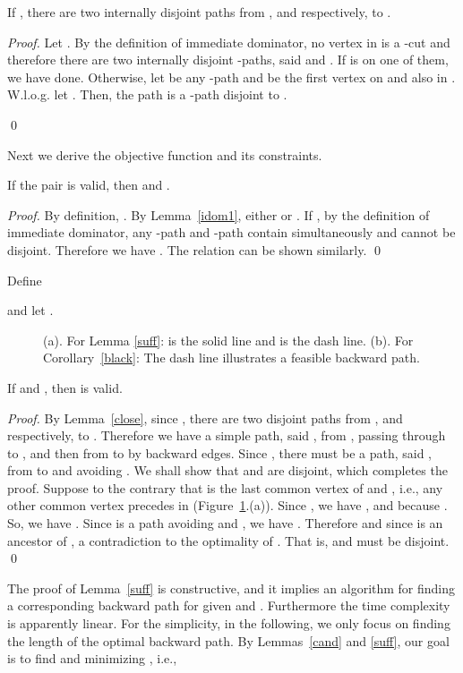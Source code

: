 \begin{lemma}\label{close}
If , there are two internally disjoint paths from , and  respectively, to . 
\end{lemma}
\begin{proof}
Let .
By the definition of immediate dominator, no vertex in  is a -cut and therefore there are two internally disjoint -paths, said  and .
If  is on one of them, we have done.
Otherwise, let  be any -path and  be the first vertex on  and also in .
W.l.o.g. let . 
Then, the path  is a -path disjoint to .

\qed\end{proof}

Next we derive the objective function and its constraints.
\begin{lemma}\label{cand}
If the pair  is valid, then  and .
\end{lemma}
\begin{proof}
By definition, . By Lemma~\ref{idom1}, either  or . 
If , by the definition of immediate dominator, any -path and -path contain  simultaneously and cannot be disjoint.
Therefore we have .
The relation  can be shown similarly.
\qed\end{proof}
Define 

and let .

\begin{figure}[t]
\begin{center}
\caption{(a). For Lemma \ref{suff}:  is the solid line and  is the dash line.
(b). For Corollary~\ref{black}: The dash line illustrates a feasible backward path.}
\label{backfig}
\end{center}
\end{figure}
\begin{lemma}\label{suff}
If  and , then  is valid.
\end{lemma}
\begin{proof}
By Lemma~\ref{close}, since , there are two disjoint paths from , and  respectively, to . 
Therefore we have a simple path, said , from , passing through  to , and then from  to  by backward edges.
Since , there must be a path, said , from  to  and avoiding .
We shall show that  and  are disjoint, which completes the proof.
Suppose to the contrary that  is the last common vertex of  and , i.e., any other common vertex
precedes  in  (Figure~\ref{backfig}.(a)). 
Since , we have , and  because . So, we have .
Since  is a path avoiding  and , we have .
Therefore  and  since  is an ancestor of , 
a contradiction to the optimality of .
That is,  and  must be disjoint.
\qed
\end{proof}
The proof of Lemma~\ref{suff} is constructive, and it implies an algorithm for finding a corresponding backward path for given  and . Furthermore the time complexity is apparently linear.
For the simplicity, in the following, we only focus on finding the length of the optimal backward path.
By Lemmas~\ref{cand} and \ref{suff}, our goal is to find  and  minimizing , i.e., 

